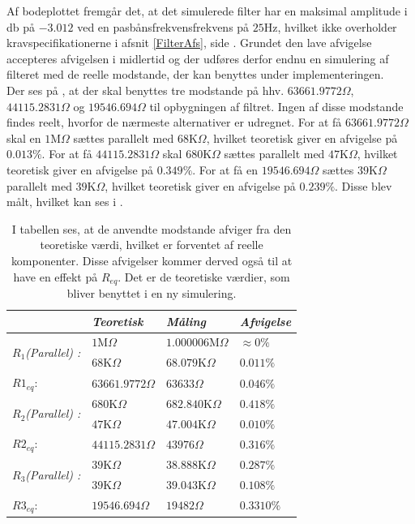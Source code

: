\noindent Af bodeplottet fremgår det, at det simulerede filter har en maksimal amplitude i db på $-3.012$ ved en pasbånsfrekvensfrekvens på $25$Hz, hvilket ikke overholder kravspecifikationerne i afsnit \ref{FilterAfs}, side \pageref{FilterAfs}. Grundet den lave afvigelse accepteres afvigelsen i midlertid og der udføres derfor endnu en simulering af filteret med de reelle modstande, der kan benyttes under implementeringen. \\
Der ses på , at der skal benyttes tre modstande på hhv. $63661.9772\Omega$, $44115.2831\Omega$ og $19546.694\Omega$ til opbygningen af filtret. Ingen af disse modstande findes reelt, hvorfor de nærmeste alternativer er udregnet. For at få $63661.9772\Omega$ skal en $1$M$\Omega$  sættes parallelt med $68$K$\Omega$, hvilket teoretisk giver en afvigelse på $0.013\%$. For at få $44115.2831\Omega$ skal $680$K$\Omega$ sættes parallelt med $47$K$\Omega$, hvilket teoretisk giver en afvigelse på $0.349\%$. For at få en $19546.694\Omega$ sættes $39$K$\Omega$ parallelt med $39$K$\Omega$, hvilket teoretisk giver en afvigelse på $0.239\%$. Disse blev målt, hvilket kan ses i .
\begin{table}[H]
	\centering
	\begin{tabular}{|l|l|l|l|}
		\hline
		\textit{}                                     & \textit{Teoretisk} & \textit{Måling}    & \textit{Afvigelse} \\ \hline
		\multirow{2}{*}{\textit{$R_{1}$(Parallel) :}} & $1$M$\Omega$       & $1.000006$M$\Omega$  & $\approx 0\%$           \\ \cline{2-4} 
		& $68$K$\Omega$      & $68.079$K$\Omega$ & $0.011\%$           \\ \cline{2-4}
		$R1_{eq}$: & $63661.9772\Omega$ & $63633\Omega$ &  $0.046\%$ \\ \hline
		\multirow{2}{*}{\textit{$R_{2}$(Parallel) :}} & $680$K$\Omega$     & $682.840$K$\Omega$  & $0.418\%$        \\ \cline{2-4} 
		& $47$K$\Omega$      & $47.004$K$\Omega$ & $0.010\%$           \\ \cline{2-4}
		$R2_{eq}$: & $44115.2831\Omega$ & $43976\Omega$ & $0.316\%$ \\ \hline
		\multirow{2}{*}{\textit{$R_{3}$(Parallel) :}} & $39$K$\Omega$      & $38.888$K$\Omega$    & $0.287\%$           \\ \cline{2-4} 
		& $39$K$\Omega$     & $39.043$K$\Omega$        & $0.108\%$           \\ \cline{2-4}
		$R3_{eq}$: & $19546.694\Omega$ & $19482\Omega$  & $0.3310\%$ \\ \hline
	\end{tabular}
	\caption{I tabellen ses, at de anvendte modstande afviger fra den teoretiske værdi, hvilket er forventet af reelle komponenter. Disse afvigelser kommer derved også til at have en effekt på $R_{eq}$. Det er de teoretiske værdier, som bliver benyttet i en ny simulering.}
	\label{Tab:Maalingafmodstande_filter}
\end{table}
